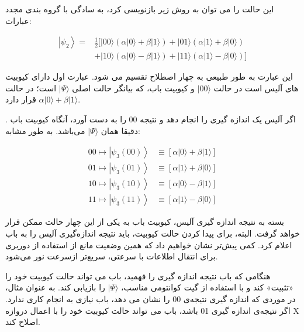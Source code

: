\documentclass{book}
\begin{document}
این حالت را می توان به روش زیر بازنویسی کرد، به سادگی با گروه بندی مجدد عبارات:

\begin{center}
	\begin{equation}\label{Teleport psi2 rewrite}
		\begin{aligned}
			\left|\psi_2\right\rangle= & \frac{1}{2}[|00\rangle(\alpha|0\rangle+\beta|1\rangle)+|01\rangle(\alpha|1\rangle+\beta|0\rangle) \\
			& +|10\rangle(\alpha|0\rangle-\beta|1\rangle)+|11\rangle(\alpha|1\rangle-\beta|0\rangle)]
		\end{aligned}
	\end{equation}

\end{center}


این عبارت به طور طبیعی به چهار اصطلاح تقسیم می شود. عبارت اول دارای کیوبیت های آلیس است
در حالت $\vert 00 \rangle$ و کیوبیت باب، که بیانگر حالت اصلی $\vert \Psi \rangle$ است؛ در حالت $\alpha \vert 0 \rangle + \beta \vert 1 \rangle$  قرار دارد.


. اگر آلیس یک اندازه گیری را انجام دهد و نتیجه 00 را به دست آورد، آنگاه کیوبیت باب دقیقا همان $\vert \Psi \rangle$ می‌باشد. به طور مشابه:
\begin{center}
	\begin{equation}\label{alice action}
		\begin{aligned}
			00 \longmapsto\left|\psi_3(00)\right\rangle & \equiv[\alpha|0\rangle+\beta|1\rangle] \\
			01 \longmapsto\left|\psi_3(01)\right\rangle & \equiv[\alpha|1\rangle+\beta|0\rangle] \\
			10 \longmapsto\left|\psi_3(10)\right\rangle & \equiv[\alpha|0\rangle-\beta|1\rangle] \\
			11 \longmapsto\left|\psi_3(11)\right\rangle & \equiv[\alpha|1\rangle-\beta|0\rangle]
		\end{aligned}
	\end{equation}
\end{center}

بسته به نتیجه اندازه گیری آلیس، کیوبیت باب به یکی از این چهار حالت ممکن قرار خواهد گرفت. البته، برای پیدا کردن حالت کیوبیت، باید نتیجه اندازه‌گیری آلیس را به باب اعلام کرد.
کمی پیش‌‌تر نشان خواهیم داد که همین وضعیت مانع از استفاده از دوربری برای انتقال اطلاعات با سرعتی، سریع‌تر ازسرعت نور می‌شود.



هنگامی که باب نتیجه اندازه گیری را فهمید، باب می تواند حالت کیوبیت خود را «تثبیت» کند و با استفاده از گیت کوانتومی مناسب، $\vert \Psi \rangle$ را بازیابی کند. به عنوان مثال، در موردی که اندازه گیری نتیجه‌ی 00 را نشان می دهد، باب نیازی به انجام کاری ندارد. اگر نتیجه‌ی اندازه گیری 01 باشد، باب می تواند حالت کیوبیت خود را با اعمال دروازه X اصلاح کند.
\end{document}
